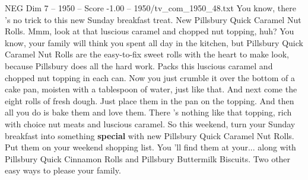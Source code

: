 \begin{textsample}{NEG Dim 7 – 1950 – Score -1.00 – 1950/tv\_com\_1950\_48.txt}  \label{ex:f7_neg_083}
You know, there 's no trick to this new Sunday breakfast treat.
New Pillsbury Quick Caramel Nut Rolls.
Mmm, look at that luscious caramel and chopped nut topping, huh?
You know, your family will think you spent all day in the kitchen, but Pillsbury Quick Caramel Nut Rolls are the easy-to-fix sweet rolls with the heart to make look, because Pillsbury does all the hard work.
Packs this luscious caramel and chopped nut topping in each can.
Now you just crumble it over the bottom of a cake pan, moisten with a tablespoon of water, just like that.
And next come the eight rolls of fresh dough.
Just place them in the pan on the topping.
And then all you do is bake them and love them.
There 's nothing like that topping, rich with choice nut meats and luscious caramel.
So this weekend, turn your Sunday breakfast into something \textbf{special} with new Pillsbury Quick Caramel Nut Rolls.
Put them on your weekend shopping list.
You 'll find them at your... along with Pillsbury Quick Cinnamon Rolls and Pillsbury Buttermilk Biscuits.
Two other easy ways to please your family.

\end{textsample}
